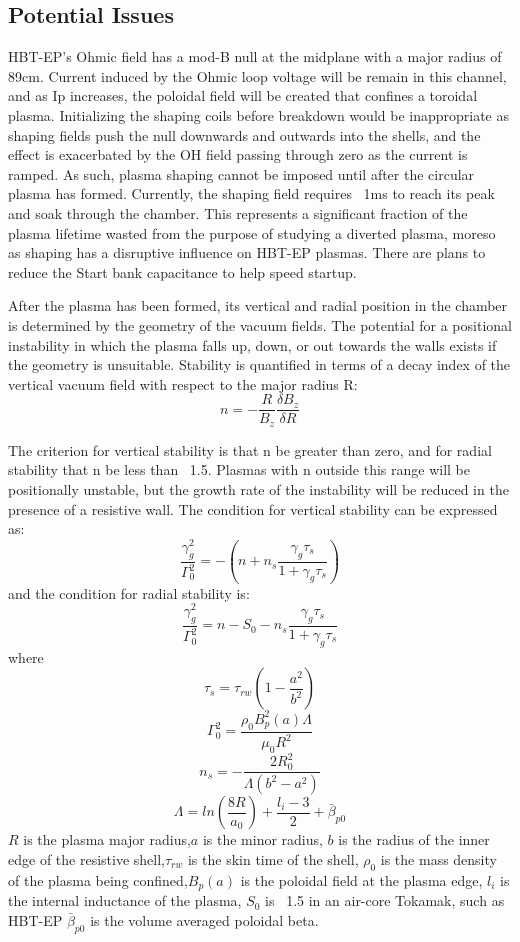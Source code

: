 \documentclass[aps,prl,twocolumn,superscriptaddress,groupedaddress]{revtex4}  %
\begin{document}
\subsection{Potential Issues}
	HBT-EP's Ohmic field has a mod-B null at the midplane with a major radius of 89cm.  Current induced by the Ohmic loop voltage will be remain in this channel, and as Ip increases, the poloidal field will be created that confines a toroidal plasma.  Initializing the shaping coils before breakdown would be inappropriate as shaping fields push the null downwards and outwards into the shells, and the effect is exacerbated by the OH field passing through zero as the current is ramped.  As such, plasma shaping cannot be imposed until after the circular plasma has formed.  Currently, the shaping field requires ~1ms to reach its peak and soak through the chamber.  This represents a significant fraction of the plasma lifetime wasted from the purpose of studying a diverted plasma, moreso as shaping has a disruptive influence on HBT-EP plasmas.  There are plans to reduce the Start bank capacitance to help speed startup.\par
	After the plasma has been formed, its vertical and radial position in the chamber is determined by the geometry of the vacuum fields.  The potential for a positional instability in which the plasma falls up, down, or out towards the walls exists if the geometry is unsuitable.  Stability is quantified in terms of a decay index of the vertical vacuum field with respect to the major radius R:$$n = -\frac{R}{B_z}\frac{\delta B_z}{\delta R}$$\par
	The criterion for vertical stability is that n be greater than zero, and for radial stability that n be less than ~1.5.  Plasmas with n outside this range will be positionally unstable, but the growth rate of the instability will be reduced in the presence of a resistive wall\cite{Fukuyama}.  The condition for vertical stability can be expressed as:
$$\frac{\gamma_g^2}{\Gamma_0^2} = -\left( n + n_s\frac{\gamma_g\tau_s}{1+\gamma_g\tau_s}\right)$$
	and the condition for radial stability is:
	$$\frac{\gamma_g^2}{\Gamma_0^2} = n - S_0 - n_s\frac{\gamma_g\tau_s}{1+\gamma_g\tau_s}$$
	where
	$$\tau_s = \tau_{rw}\left(1-\frac{a^2}{b^2}\right)$$
	$$\Gamma_0^2 = \frac{\rho_0 B_p^2(a)\Lambda}{\mu_0 R^2}$$
	$$n_s = -\frac{2 R_0^2}{\Lambda (b^2-a^2)}$$
	$$\Lambda = ln\left(\frac{8R}{a_0}\right) + \frac{l_i -3}{2} + \bar{\beta}_{p0}$$
	$R$ is the plasma major radius,$a$ is the minor radius, $b$ is the radius of the inner edge of the resistive shell,$\tau_{rw}$ is the skin time of the shell, $\rho_0$ is the mass density of the plasma being confined,$B_p(a)$ is the poloidal field at the plasma edge, $l_i$ is the internal inductance of the plasma, $S_0$ is ~1.5 in an air-core Tokamak, such as HBT-EP  $\bar{\beta}_{p0}$ is the volume averaged poloidal beta.\par
\end{document}
